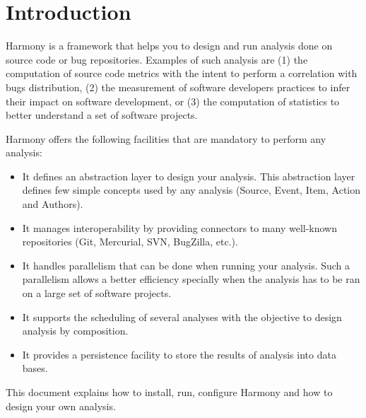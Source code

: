 \chapter{Introduction}\label{chap:Introduction}

Harmony is a framework that helps you to design and run analysis done on source code or bug repositories. Examples of such analysis are (1) the computation of source code metrics with the intent to perform a correlation with bugs distribution, (2) the measurement of software developers practices to infer their impact on software development, or (3) the computation of statistics to better understand a set of software projects.

Harmony offers the following facilities that are mandatory to perform any analysis:
\begin{itemize}
\item It defines an abstraction layer to design your analysis. This abstraction layer defines few simple concepts  used by any analysis (Source, Event, Item, Action and Authors).
\item It manages interoperability by providing connectors to many well-known repositories (Git, Mercurial, SVN, BugZilla, etc.).
\item It handles parallelism that can be done when running your analysis. Such a parallelism allows a better efficiency specially when the analysis has to be ran on a large set of software projects.
\item It supports the scheduling of several analyses with the objective to design analysis by composition.
\item It provides a persistence facility to store the results of analysis into data bases.
\end{itemize}

This document explains how to install, run, configure Harmony and how to design your own analysis.
